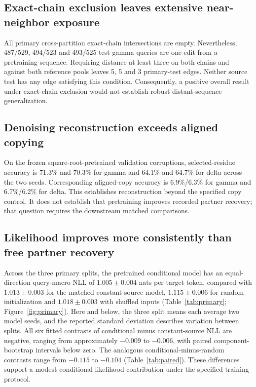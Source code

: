 \documentclass[10pt]{article}
\begin{document}
\subsection{Exact-chain exclusion leaves extensive near-neighbor exposure}
All primary cross-partition exact-chain intersections are empty. Nevertheless,
487/529, 494/523 and 493/525 test gamma queries are one edit from a pretraining
sequence. Requiring distance at least three on both chains and against both
reference pools leaves 5, 5 and 3 primary-test edges. Neither source test has any
edge satisfying this condition. Consequently, a positive overall result under
exact-chain exclusion would not establish robust distant-sequence generalization.

\subsection{Denoising reconstruction exceeds aligned copying}
On the frozen square-root-pretrained validation corruptions, selected-residue
accuracy is 71.3\% and 70.3\% for gamma and 64.1\% and 64.7\% for delta across
the two seeds. Corresponding aligned-copy accuracy is 6.9\%/6.3\% for gamma and
6.7\%/6.2\% for delta. This establishes reconstruction beyond the specified
copy control. It does not establish that pretraining improves recorded partner
recovery; that question requires the downstream matched comparisons.

\subsection{Likelihood improves more consistently than free partner recovery}
Across the three primary splits, the pretrained conditional model has an
equal-direction query-macro NLL of $1.005\pm0.004$ nats per target token,
compared with $1.013\pm0.003$ for the matched constant-source model,
$1.115\pm0.006$ for random initialization and $1.018\pm0.003$ with shuffled
inputs (Table~\ref{tab:primary}; Figure~\ref{fig:primary}). Here and below,
the three split means each average two model seeds, and the reported standard
deviation describes variation between splits. All six fitted contrasts of conditional minus constant-source NLL are negative, ranging from approximately $-0.009$ to
$-0.006$, with paired component-bootstrap intervals below zero. The analogous
conditional-minus-random contrasts range from $-0.115$ to $-0.104$
(Table~\ref{tab:paired}). These differences support a modest conditional
likelihood contribution under the specified training protocol.
\end{document}
